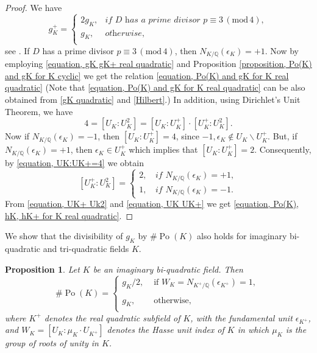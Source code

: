 \documentclass[12pt]{amsart}
\newtheorem{proposition}[theorem]{Proposition}
\theoremstyle{definition}
\numberwithin{equation}{section}
\DeclareMathOperator{\Po}{Po}
\begin{document}
\begin{proof}
We have
	\begin{equation} \label{equation, gK gK+ real quadratic}
		g_K^+=
		\left\{
		\begin{array}{ll}
			2g_K, &  \textit{if $D$ has a prime divisor $p \equiv 3 \, (\mathrm{mod}\, 4)$},\\
			g_K,  &  \textit{otherwise},\\
		\end{array}
		\right.
	\end{equation}
	see \cite[Proposition 3.11]{Leriche 2014}. 
If $D$ has a prime divisor  $p \equiv 3 \, (\mathrm{mod}\, 4)$, then $N_{K/\mathbb{Q}}(\epsilon_{K})=+1$. Now by employing  \eqref{equation, gK gK+ real quadratic} and
Proposition \ref{proposition, Po(K) and gK for K cyclic} we get the relation \eqref{equation, Po(K) and gK for K real quadratic} (Note that \eqref{equation, Po(K) and gK for K real quadratic} can be also obtained from \eqref{gK quadratic} and \eqref{Hilbert}.) In addition,
 using Dirichlet's Unit Theorem, we have
\begin{equation} \label{equation, UK:UK+=4}
	4=\left[U_K:U_K^2\right]=\left[U_K:U_K^+\right]\cdot \left[U_K^+:U_K^2\right].
\end{equation}
Now if $N_{K/\mathbb{Q}}(\epsilon_K)=-1$, then $\left[U_K:U_K^+\right]=4$, since $-1,\epsilon_K \not \in U_K \backslash U_K^+$. But, if $N_{K/\mathbb{Q}}(\epsilon_K)=+1$, then $\epsilon_K \in U_K^+$ which implies that $\left[U_K:U_K^+\right]=2$. Consequently, by \eqref{equation, UK:UK+=4} we obtain 
		\begin{equation} \label{equation, UK UK+}
		\left[U_K^+:U_K^2\right] =
		\begin{cases}
			2, \,  & \textit{if} \, \, N_{K/\mathbb{Q}}(\epsilon_K)=+1, \\
			1, \,  & \textit{if}  \, \, N_{K/\mathbb{Q}}(\epsilon_K)=-1.
		\end{cases}
	\end{equation}
	From \eqref{equation, UK+ Uk2} and  \eqref{equation, UK UK+} we get \eqref{equation, Po(K), hK, hK+ for K real quadratic}.
\end{proof}
We show that the divisibility of $g_K$ by $\# \Po(K)$ also holds for imaginary bi-quadratic and tri-quadratic fields $K$. 
\begin{proposition} \label{proposition, Po(K) and gK for K imaginary bi-quadratic}
Let $K$ be an imaginary bi-quadratic field. Then
\begin{equation*} 
	\# \Po(K) = \left\{
	\begin{array}{ll}
		g_K/2, \,  & \, \text{if} \, \, W_K=N_{K^+/\mathbb{Q}}(\epsilon_{K^+})=1, \, \\
		& \\
		g_K, \, & \, \text{otherwise,} \\	
	\end{array}
	\right.
\end{equation*}
where $K^+$ denotes the real quadratic subfield of $K$, with the fundamental unit $\epsilon_{K^+}$, and $			W_K=\left[U_K:\mu_K\cdot U_{K^+}\right]$
denotes the Hasse unit index of $K$ in which  $\mu_K$ is the group of roots of unity in $K$.
\end{proposition}
\end{document}
